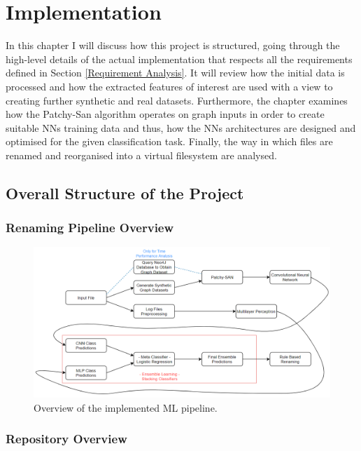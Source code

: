 

\chapter{Implementation}

In this chapter I will discuss how this project is structured, going through the high-level details of the actual implementation that respects all the requirements defined in Section \ref{Requirement Analysis}. It will review how the initial data is processed and how the extracted features of interest are used with a view to creating further synthetic and real datasets. Furthermore, the chapter examines how the Patchy-San algorithm operates on graph inputs in order to create suitable NNs training data and thus, how the NNs architectures are designed and optimised for the given classification task. Finally, the way in which files are renamed and reorganised into a virtual filesystem are analysed. \\



\section{Overall Structure of the Project}

\subsection{Renaming Pipeline Overview}
\begin{figure}[H]
  \centering
  \centerline{\includegraphics[scale = 0.6]{Images/pipeline.png}}
  \caption{Overview of the implemented ML pipeline.}
  \label{pipeline}
\end{figure}
\subsection{Repository Overview}

